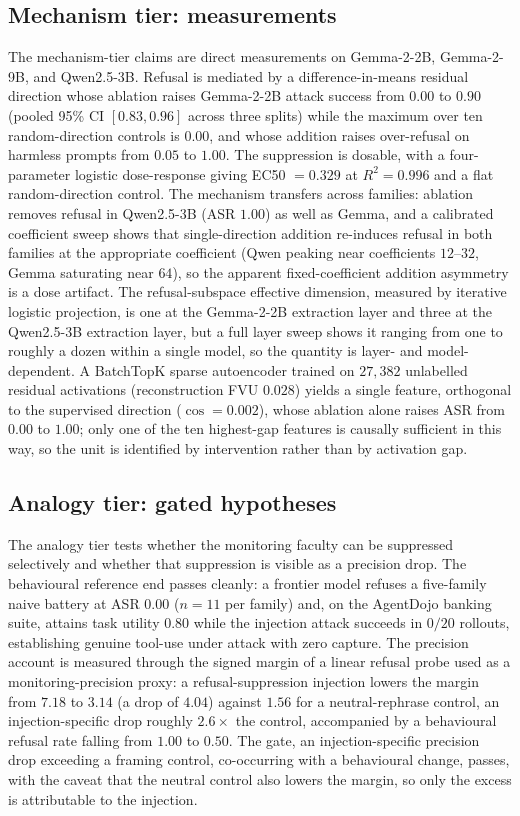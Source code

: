 \subsection{Mechanism tier: measurements}
The mechanism-tier claims are direct measurements on Gemma-2-2B, Gemma-2-9B, and
Qwen2.5-3B. Refusal is mediated by a difference-in-means residual direction whose
ablation raises Gemma-2-2B attack success from $0.00$ to $0.90$ (pooled 95\% CI
$[0.83,0.96]$ across three splits) while the maximum over ten random-direction
controls is $0.00$, and whose addition raises over-refusal on harmless prompts from
$0.05$ to $1.00$. The suppression is dosable, with a four-parameter logistic
dose-response giving EC50 $=0.329$ at $R^2=0.996$ and a flat random-direction control.
The mechanism transfers across families: ablation removes refusal in Qwen2.5-3B
(ASR $1.00$) as well as Gemma, and a calibrated coefficient sweep shows that
single-direction addition re-induces refusal in both families at the appropriate
coefficient (Qwen peaking near coefficients $12$--$32$, Gemma saturating near $64$),
so the apparent fixed-coefficient addition asymmetry is a dose artifact. The
refusal-subspace effective dimension, measured by iterative logistic projection, is
one at the Gemma-2-2B extraction layer and three at the Qwen2.5-3B extraction layer,
but a full layer sweep shows it ranging from one to roughly a dozen within a single
model, so the quantity is layer- and model-dependent. A BatchTopK sparse autoencoder
trained on $27{,}382$ unlabelled residual activations (reconstruction FVU $0.028$)
yields a single feature, orthogonal to the supervised direction ($\cos = 0.002$),
whose ablation alone raises ASR from $0.00$ to $1.00$; only one of the ten highest-gap
features is causally sufficient in this way, so the unit is identified by intervention
rather than by activation gap.

\subsection{Analogy tier: gated hypotheses}
The analogy tier tests whether the monitoring faculty can be suppressed selectively
and whether that suppression is visible as a precision drop. The behavioural reference
end passes cleanly: a frontier model refuses a five-family naive battery at ASR $0.00$
($n=11$ per family) and, on the AgentDojo banking suite, attains task utility $0.80$
while the injection attack succeeds in $0/20$ rollouts, establishing genuine tool-use
under attack with zero capture. The precision account is measured through the signed
margin of a linear refusal probe used as a monitoring-precision proxy: a
refusal-suppression injection lowers the margin from $7.18$ to $3.14$ (a drop of
$4.04$) against $1.56$ for a neutral-rephrase control, an injection-specific drop
roughly $2.6\times$ the control, accompanied by a behavioural refusal rate falling
from $1.00$ to $0.50$. The gate, an injection-specific precision drop exceeding a
framing control, co-occurring with a behavioural change, passes, with the caveat that
the neutral control also lowers the margin, so only the excess is attributable to the
injection.

